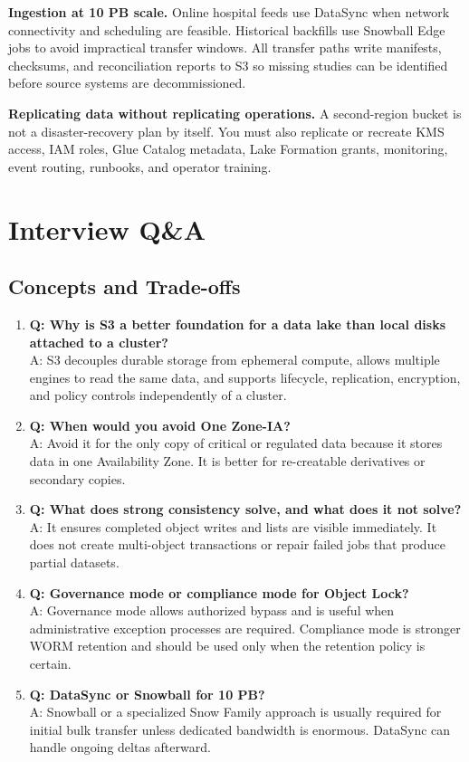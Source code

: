 \textbf{Ingestion at 10 PB scale.} Online hospital feeds use DataSync when network connectivity and scheduling are feasible. Historical backfills use Snowball Edge jobs to avoid impractical transfer windows. All transfer paths write manifests, checksums, and reconciliation reports to S3 so missing studies can be identified before source systems are decommissioned.

\begin{pitfall}
\textbf{Replicating data without replicating operations.} A second-region bucket is not a disaster-recovery plan by itself. You must also replicate or recreate KMS access, IAM roles, Glue Catalog metadata, Lake Formation grants, monitoring, event routing, runbooks, and operator training.
\end{pitfall}

\section{Interview Q\&A}
\subsection{Concepts and Trade-offs}
\begin{enumerate}
    \item \textbf{Q: Why is S3 a better foundation for a data lake than local disks attached to a cluster?}\\
    A: S3 decouples durable storage from ephemeral compute, allows multiple engines to read the same data, and supports lifecycle, replication, encryption, and policy controls independently of a cluster.
    \item \textbf{Q: When would you avoid One Zone-IA?}\\
    A: Avoid it for the only copy of critical or regulated data because it stores data in one Availability Zone. It is better for re-creatable derivatives or secondary copies.
    \item \textbf{Q: What does strong consistency solve, and what does it not solve?}\\
    A: It ensures completed object writes and lists are visible immediately. It does not create multi-object transactions or repair failed jobs that produce partial datasets.
    \item \textbf{Q: Governance mode or compliance mode for Object Lock?}\\
    A: Governance mode allows authorized bypass and is useful when administrative exception processes are required. Compliance mode is stronger WORM retention and should be used only when the retention policy is certain.
    \item \textbf{Q: DataSync or Snowball for 10 PB?}\\
    A: Snowball or a specialized Snow Family approach is usually required for initial bulk transfer unless dedicated bandwidth is enormous. DataSync can handle ongoing deltas afterward.
\end{enumerate}

